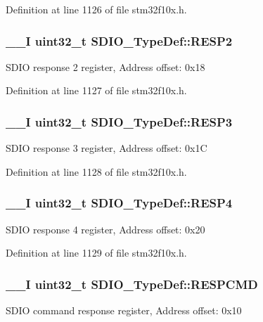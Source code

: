 Definition at line 1126 of file stm32f10x.\-h.

\hypertarget{struct_s_d_i_o___type_def_a9228c8a38c07c508373644220dd322f0}{
\subsubsection[{R\-E\-S\-P2}]{\setlength{\rightskip}{0pt plus 5cm}\-\_\-\-\_\-\-I {\bf uint32\-\_\-t} S\-D\-I\-O\-\_\-\-Type\-Def\-::\-R\-E\-S\-P2}}\label{struct_s_d_i_o___type_def_a9228c8a38c07c508373644220dd322f0}
S\-D\-I\-O response 2 register, Address offset\-: 0x18 

Definition at line 1127 of file stm32f10x.\-h.

\hypertarget{struct_s_d_i_o___type_def_a70f3e911570bd326bff852664fd8a7d5}{
\subsubsection[{R\-E\-S\-P3}]{\setlength{\rightskip}{0pt plus 5cm}\-\_\-\-\_\-\-I {\bf uint32\-\_\-t} S\-D\-I\-O\-\_\-\-Type\-Def\-::\-R\-E\-S\-P3}}\label{struct_s_d_i_o___type_def_a70f3e911570bd326bff852664fd8a7d5}
S\-D\-I\-O response 3 register, Address offset\-: 0x1\-C 

Definition at line 1128 of file stm32f10x.\-h.

\hypertarget{struct_s_d_i_o___type_def_ac7b45c7672922d38ffb0a1415a122716}{
\subsubsection[{R\-E\-S\-P4}]{\setlength{\rightskip}{0pt plus 5cm}\-\_\-\-\_\-\-I {\bf uint32\-\_\-t} S\-D\-I\-O\-\_\-\-Type\-Def\-::\-R\-E\-S\-P4}}\label{struct_s_d_i_o___type_def_ac7b45c7672922d38ffb0a1415a122716}
S\-D\-I\-O response 4 register, Address offset\-: 0x20 

Definition at line 1129 of file stm32f10x.\-h.

\hypertarget{struct_s_d_i_o___type_def_a9d881ed6c2fdecf77e872bcc6b404774}{
\subsubsection[{R\-E\-S\-P\-C\-M\-D}]{\setlength{\rightskip}{0pt plus 5cm}\-\_\-\-\_\-\-I {\bf uint32\-\_\-t} S\-D\-I\-O\-\_\-\-Type\-Def\-::\-R\-E\-S\-P\-C\-M\-D}}\label{struct_s_d_i_o___type_def_a9d881ed6c2fdecf77e872bcc6b404774}
S\-D\-I\-O command response register, Address offset\-: 0x10 

